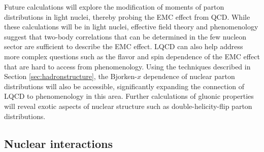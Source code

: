 Future calculations will explore the modification of moments of parton distributions in light nuclei, thereby probing the EMC effect from QCD. While these calculations will be in light nuclei, effective field theory \cite{Chen:2004zx,Chen:2016bde} and phenomenology \cite{Hen:2016kwk} suggest that two-body correlations that can be determined in the few nucleon sector are sufficient to describe the EMC effect. LQCD can also help address more complex questions such as the flavor and spin dependence of the EMC effect that are hard to access from phenomenology. Using the techniques described in Section \ref{sec:hadronstructure}, the Bjorken-$x$ dependence of nuclear parton distributions will also be accessible, significantly expanding the connection of LQCD to phenomenology in this area. Further calculations of gluonic properties will reveal exotic aspects of nuclear structure such as double-helicity-flip parton distributions.





\subsection{Nuclear interactions}


